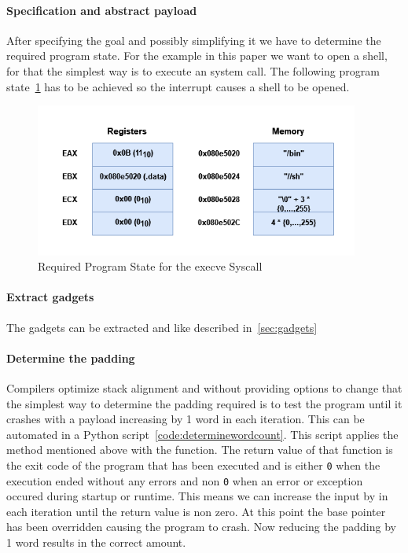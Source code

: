 \documentclass[journal=tosc,submission, notanonymous]{iacrtrans}
\begin{document}
\paragraph{Specification and abstract payload}
\label{par:goal}
After specifying the goal and possibly simplifying it we have to determine the required program state. For the example in this paper we want to open a shell, for that the simplest way is to execute an  system call. The following program state~\cref{fig:stateforint} has to be achieved so the interrupt  causes a shell to be opened.~\cite{pixis}~\cite{proggen-rop}
\begin{figure}[h]
  \centering
  \includegraphics[width=0.95\textwidth]{requirementstackmemory.png}
  \caption{Required Program State for the execve Syscall}
  \label{fig:stateforint}
\end{figure}
\paragraph{Extract gadgets}
The gadgets can be extracted and like described in~\cref{sec:gadgets}
\paragraph{Determine the padding}
Compilers optimize stack alignment and without providing options to change that the simplest way to determine the padding required is to test the program until it crashes with a payload increasing by 1 word in each iteration. This can be automated in a Python script~\cref{code:determinewordcount}. This script applies the method mentioned above with the  function. The return value of that function is the exit code of the program that has been executed and is either \Verb+0+ when the execution ended without any errors and non \Verb+0+ when an error or exception occured during startup or runtime. This means we can increase the input by  in each iteration until the return value is non zero. At this point the base pointer  has been overridden causing the program to crash. Now reducing the padding by 1 word results in the correct amount.
\end{document}
